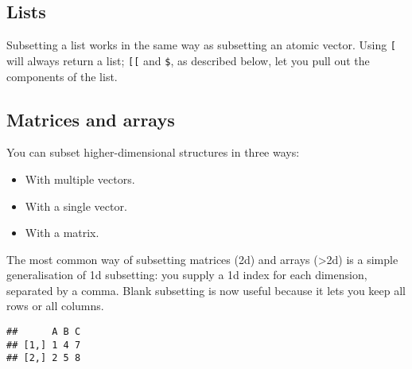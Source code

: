 \hypertarget{lists}{%
\subsection{Lists}\label{lists}}

Subsetting a list works in the same way as subsetting an atomic vector.
Using \texttt{{[}} will always return a list; \texttt{{[}{[}} and
\texttt{\$}, as described below, let you pull out the components of the
list.  

\hypertarget{matrix-subsetting}{%
\subsection{Matrices and arrays}\label{matrix-subsetting}}

You can subset higher-dimensional structures in three ways:
 

\begin{itemize}
\tightlist
\item
  With multiple vectors.
\item
  With a single vector.
\item
  With a matrix.
\end{itemize}

The most common way of subsetting matrices (2d) and arrays
(\textgreater{}2d) is a simple generalisation of 1d subsetting: you
supply a 1d index for each dimension, separated by a comma. Blank
subsetting is now useful because it lets you keep all rows or all
columns.

\begin{Shaded}
\begin{Highlighting}[]
\StringTok{ }\NormalTok{(}\OperatorTok{:}\NormalTok{, } \NormalTok{)}
\StringTok{ }\NormalTok{(}\NormalTok{, }\NormalTok{, }\NormalTok{)}
\NormalTok{a[}\OperatorTok{:}\NormalTok{, ]}
\end{Highlighting}
\end{Shaded}

\begin{verbatim}
##      A B C
## [1,] 1 4 7
## [2,] 2 5 8
\end{verbatim}

\begin{Shaded}
\begin{Highlighting}[]
\NormalTok{a[}\NormalTok{(}\NormalTok{, }\NormalTok{, }\NormalTok{), }\NormalTok{(}\NormalTok{, }\NormalTok{)]}
\end{Highlighting}
\end{Shaded}

